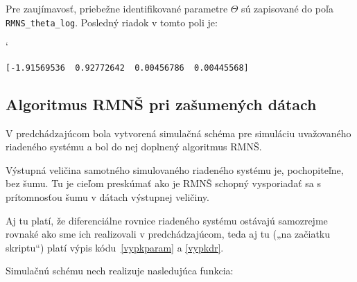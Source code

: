 \documentclass[a4paper, 10pt, ]{article}
\begin{document}
\begin{centering}


    \vspace{-2mm}

    \figcaption{}

    \vspace{2mm}

    \label{figsc_ar03_fig02_0}

\end{centering}


Pre zaujímavosť, priebežne identifikované parametre $\Theta$ sú zapisované do poľa \lstinline{RMNS_theta_log}. Posledný riadok v tomto poli je:

{\catcode`

}


\begin{lstlisting}[numbers=none]
[-1.91569536  0.92772642  0.00456786  0.00445568]
\end{lstlisting}








\subsection{Algoritmus RMNŠ pri zašumených dátach}

V predchádzajúcom bola vytvorená simulačná schéma pre simuláciu uvažovaného riadeného systému a bol do nej doplnený algoritmus RMNŠ.

Výstupná veličina samotného simulovaného riadeného systému je, pochopiteľne, bez šumu. Tu je cieľom preskúmať ako je RMNŠ schopný vysporiadať sa s prítomnosťou šumu v dátach výstupnej veličiny.



\bigskip

\noindent
Aj tu platí, že diferenciálne rovnice riadeného systému ostávajú samozrejme rovnaké ako sme ich realizovali v predchádzajúcom, teda aj tu („na začiatku skriptu“) platí výpis kódu~\ref{vypkparam} a \ref{vypkdr}.

\bigskip


\noindent
Simulačnú schému nech realizuje nasledujúca funkcia:
\end{document}
